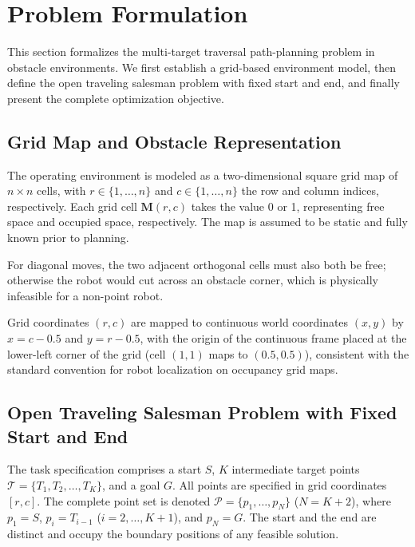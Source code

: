 \section{Problem Formulation}
\label{sec:form}

This section formalizes the multi-target traversal path-planning problem in obstacle environments. We first establish a grid-based environment model, then define the open traveling salesman problem with fixed start and end, and finally present the complete optimization objective.

\subsection{Grid Map and Obstacle Representation}

The operating environment is modeled as a two-dimensional square grid map of $n \times n$ cells, with $r \in \{1, \dots, n\}$ and $c \in \{1, \dots, n\}$ the row and column indices, respectively. Each grid cell $\mathbf{M}(r, c)$ takes the value 0 or 1, representing free space and occupied space, respectively. The map is assumed to be static and fully known prior to planning.

For diagonal moves, the two adjacent orthogonal cells must also both be free; otherwise the robot would cut across an obstacle corner, which is physically infeasible for a non-point robot.

Grid coordinates $(r, c)$ are mapped to continuous world coordinates $(x, y)$ by $x = c - 0.5$ and $y = r - 0.5$, with the origin of the continuous frame placed at the lower-left corner of the grid (cell $(1,1)$ maps to $(0.5, 0.5)$), consistent with the standard convention for robot localization on occupancy grid maps.

\subsection{Open Traveling Salesman Problem with Fixed Start and End}
\label{subsec:otspp}

The task specification comprises a start $S$, $K$ intermediate target points $\mathcal{T} = \{T_1, T_2, \dots, T_K\}$, and a goal $G$. All points are specified in grid coordinates $[r, c]$. The complete point set is denoted $\mathcal{P} = \{p_1, \dots, p_N\}$ ($N = K + 2$), where $p_1 = S$, $p_i = T_{i-1}$ ($i = 2, \dots, K+1$), and $p_N = G$. The start and the end are distinct and occupy the boundary positions of any feasible solution.

